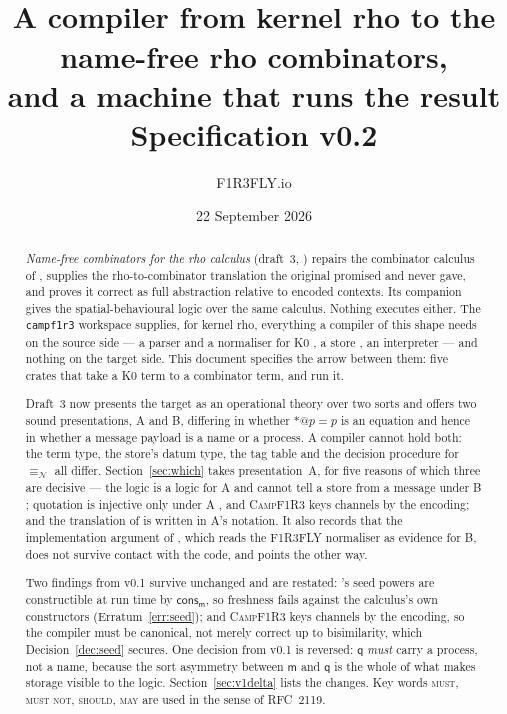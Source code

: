 \documentclass[11pt,a4paper]{article}
\title{\textbf{\Comb}\\[1mm]
\large A compiler from kernel rho to the name-free rho combinators,\\
and a machine that runs the result\\[2mm]
\normalsize Specification v0.2}
\author{F1R3FLY.io}
\date{22 September 2026}
\makeatletter
\newcommand{\code}[1]{\texttt{#1}}
\newcommand{\Camp}{\textsc{CampF1R3}}
\newcommand{\MUST}{\textsc{must}}
\newcommand{\MUSTNOT}{\textsc{must not}}
\newcommand{\SHOULD}{\textsc{should}}
\newcommand{\MAY}{\textsc{may}}
\newcommand{\quo}[1]{@#1}
\newcommand{\drp}[1]{{*}#1}
\newcommand{\nequiv}{\equiv_{\mathcal{N}}}
\newcommand{\mm}{\mathsf{m}}
\newcommand{\qq}{\mathsf{q}}
\newcommand{\cons}{\mathsf{cons}}
\theoremstyle{definition}
\theoremstyle{plain}
\makeatother
\begin{document}
\maketitle

\begin{abstract}
\noindent
\emph{Name-free combinators for the rho calculus} (draft~3, \cite{draft3})
repairs the combinator calculus of \cite{rhocomb}, supplies the
rho-to-combinator translation the original promised and never gave, and proves
it correct as full abstraction relative to encoded contexts. Its companion
\cite{logic} gives the spatial-behavioural logic over the same calculus.
Nothing executes either. The \code{campf1r3} workspace supplies, for kernel
rho, everything a compiler of this shape needs on the source side --- a parser
and a normaliser for K0 \cite{k1ndl1ng}, a store \cite{campf1r3}, an
interpreter \cite{bytecode} --- and nothing on the target side. This document
specifies the arrow between them: five crates that take a K0 term to a
combinator term, and run it.

Draft~3 now presents the target as an operational theory over two sorts and
offers two sound presentations, A and B, differing in whether
$\drp{\quo{p}} = p$ is an equation and hence in whether a message payload is
a name or a process. A compiler cannot hold both: the term type, the store's
datum type, the tag table and the decision procedure for $\nequiv$ all differ.
Section~\ref{sec:which} takes presentation~A, for five reasons of which three
are decisive --- the logic is a logic for A and cannot tell a store from a
message under B \cite[Rem.~2.5]{logic}; quotation is injective only under A
\cite[Prop.~2.10]{logic}, and \Camp{} keys channels by the encoding; and the
translation of \cite[Def.~6.6]{draft3} is written in A's notation. It also
records that the implementation argument of \cite[\S4]{draft3}, which reads
the F1R3FLY normaliser as evidence for B, does not survive contact with the
code, and points the other way.

Two findings from v0.1 survive unchanged and are restated:
\cite[Def.~6.1]{draft3}'s seed powers are constructible at run time by
$\cons_{\mm}$, so freshness fails against the calculus's own constructors
(Erratum~\ref{err:seed}); and \Camp{} keys channels by the encoding, so the
compiler must be canonical, not merely correct up to bisimilarity, which
Decision~\ref{dec:seed} secures. One decision from v0.1 is reversed:
$\qq$ \emph{must} carry a process, not a name, because the sort asymmetry
between $\mm$ and $\qq$ is the whole of what makes storage visible to the
logic. Section~\ref{sec:v1delta} lists the changes.
Key words \MUST, \MUSTNOT, \SHOULD, \MAY{} are used in the sense of RFC~2119.
\end{abstract}
\end{document}
